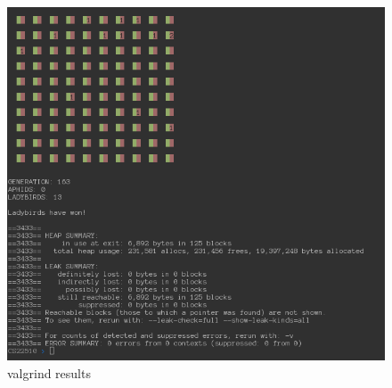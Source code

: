 \documentclass[10pt]{article}
\begin{document}
  \begin{figure}[ht!]
  \centering
  \includegraphics[scale=0.5]{../images/memcheck.png}
  \caption{valgrind results \label{overflow}}
  \end{figure}
\end{document}
